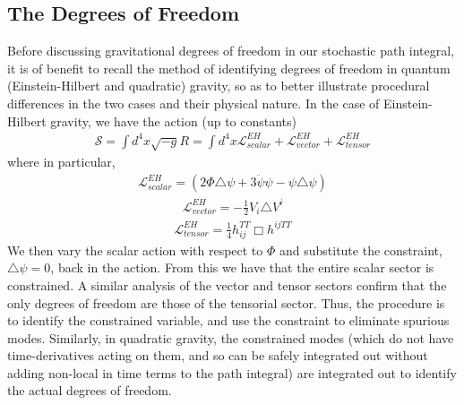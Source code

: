 \documentclass[aps,preprintnumbers,superscriptaddress,longbibliography]{revtex4-1}
\newcommand{\MS}[1]{{\color{blue}#1}}
\begin{document}
\subsection{The Degrees of Freedom}
\label{DOF}
Before discussing gravitational degrees of freedom in our stochastic path integral, it is of benefit to recall the method of identifying degrees of freedom in quantum (Einstein-Hilbert and quadratic) gravity, so as to better illustrate  procedural differences in the two cases and their physical nature. In the case of Einstein-Hilbert gravity, we have the action (up to constants)
\begin{align}
    \label{eq:Einstein-Hilbert}
    \mathcal{S}=\int d^4x\sqrt{-g}R=\int d^4x \mathcal{L}^{{EH}}_{scalar}+\mathcal{L}^{{EH}}_{vector}+\mathcal{L}^{{EH}}_{tensor}
\end{align}
where in particular,%
\begin{align}
\mathcal{L}^{{EH}}_{scalar}=(2\Phi\triangle\psi+3\ddot{\psi}\psi-\psi\triangle\psi)
\end{align}
\begin{align}
    \mathcal{L}^{{EH}}_{vector}=-\frac{1}{2}V_i\triangle V^i
\end{align}
\begin{align}
    \mathcal{L}^{{EH}}_{tensor}=\frac{1}{4}h_{ij}^{TT}\Box h^{ijTT}
\end{align}
We then vary the scalar action with respect to $\Phi$ and substitute the constraint, $\triangle\psi=0$, back in the action. From this we have that the entire scalar sector is constrained. A similar analysis of the vector and tensor sectors confirm that the only degrees of freedom are those of the tensorial sector. Thus, the procedure is to identify the constrained variable, and use the constraint to eliminate spurious modes. Similarly, in quadratic gravity, the constrained modes (which do not have time-derivatives acting on them, and so can be safely integrated out without adding non-local in time terms to the path integral) are integrated out to identify the actual degrees of freedom.
\end{document}
